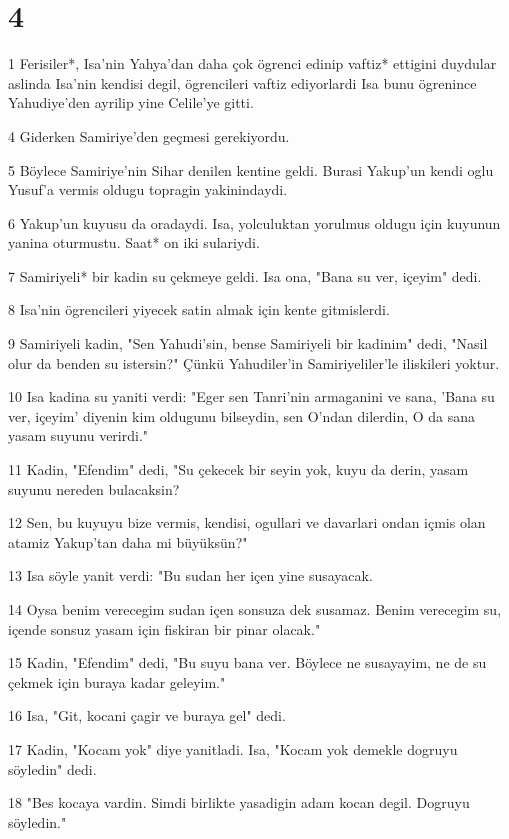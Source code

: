 \chapter{4}

\par 1 Ferisiler*, Isa'nin Yahya'dan daha çok ögrenci edinip vaftiz* ettigini duydular aslinda Isa'nin kendisi degil, ögrencileri vaftiz ediyorlardi Isa bunu ögrenince Yahudiye'den ayrilip yine Celile'ye gitti.
\par 4 Giderken Samiriye'den geçmesi gerekiyordu.
\par 5 Böylece Samiriye'nin Sihar denilen kentine geldi. Burasi Yakup'un kendi oglu Yusuf'a vermis oldugu topragin yakinindaydi.
\par 6 Yakup'un kuyusu da oradaydi. Isa, yolculuktan yorulmus oldugu için kuyunun yanina oturmustu. Saat* on iki sulariydi.
\par 7 Samiriyeli* bir kadin su çekmeye geldi. Isa ona, "Bana su ver, içeyim" dedi.
\par 8 Isa'nin ögrencileri yiyecek satin almak için kente gitmislerdi.
\par 9 Samiriyeli kadin, "Sen Yahudi'sin, bense Samiriyeli bir kadinim" dedi, "Nasil olur da benden su istersin?" Çünkü Yahudiler'in Samiriyeliler'le iliskileri yoktur.
\par 10 Isa kadina su yaniti verdi: "Eger sen Tanri'nin armaganini ve sana, 'Bana su ver, içeyim' diyenin kim oldugunu bilseydin, sen O'ndan dilerdin, O da sana yasam suyunu verirdi."
\par 11 Kadin, "Efendim" dedi, "Su çekecek bir seyin yok, kuyu da derin, yasam suyunu nereden bulacaksin?
\par 12 Sen, bu kuyuyu bize vermis, kendisi, ogullari ve davarlari ondan içmis olan atamiz Yakup'tan daha mi büyüksün?"
\par 13 Isa söyle yanit verdi: "Bu sudan her içen yine susayacak.
\par 14 Oysa benim verecegim sudan içen sonsuza dek susamaz. Benim verecegim su, içende sonsuz yasam için fiskiran bir pinar olacak."
\par 15 Kadin, "Efendim" dedi, "Bu suyu bana ver. Böylece ne susayayim, ne de su çekmek için buraya kadar geleyim."
\par 16 Isa, "Git, kocani çagir ve buraya gel" dedi.
\par 17 Kadin, "Kocam yok" diye yanitladi. Isa, "Kocam yok demekle dogruyu söyledin" dedi.
\par 18 "Bes kocaya vardin. Simdi birlikte yasadigin adam kocan degil. Dogruyu söyledin."
